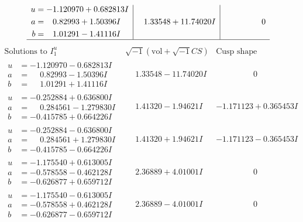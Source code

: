 \documentclass[1p]{elsarticle_modified}
\theoremstyle{definition}
\newcommand{\I}{\sqrt{-1}}
\begin{document}
$$\begin{array}{c|c|c}
\begin{aligned}
u &= -1.120970 + 0.682813 I \\
a &= \phantom{-}0.82993 + 1.50396 I \\
b &= \phantom{-}1.01291 - 1.41116 I\end{aligned}
 & \phantom{-}1.33548 + 11.74020 I & \phantom{-0.000000 } 0\\
 \hline 
 \end{array}$$\newpage$$\begin{array}{c|c|c}  
\text{Solutions to }I^u_{1}& \I (\text{vol} + \sqrt{-1}CS) & \text{Cusp shape}\\
 \hline 
\begin{aligned}
u &= -1.120970 - 0.682813 I \\
a &= \phantom{-}0.82993 - 1.50396 I \\
b &= \phantom{-}1.01291 + 1.41116 I\end{aligned}
 & \phantom{-}1.33548 - 11.74020 I & \phantom{-0.000000 } 0 \\ \hline\begin{aligned}
u &= -0.252884 + 0.636800 I \\
a &= \phantom{-}0.284561 - 1.279830 I \\
b &= -0.415785 + 0.664226 I\end{aligned}
 & \phantom{-}1.41320 - 1.94621 I & -1.171123 + 0.365453 I \\ \hline\begin{aligned}
u &= -0.252884 - 0.636800 I \\
a &= \phantom{-}0.284561 + 1.279830 I \\
b &= -0.415785 - 0.664226 I\end{aligned}
 & \phantom{-}1.41320 + 1.94621 I & -1.171123 - 0.365453 I \\ \hline\begin{aligned}
u &= -1.175540 + 0.613005 I \\
a &= -0.578558 - 0.462128 I \\
b &= -0.626877 + 0.659712 I\end{aligned}
 & \phantom{-}2.36889 + 4.01001 I & \phantom{-0.000000 } 0 \\ \hline\begin{aligned}
u &= -1.175540 - 0.613005 I \\
a &= -0.578558 + 0.462128 I \\
b &= -0.626877 - 0.659712 I\end{aligned}
 & \phantom{-}2.36889 - 4.01001 I & \phantom{-0.000000 } 0 \\ \hline\begin{aligned}

\end{aligned}
\end{array}$$
\end{document}
